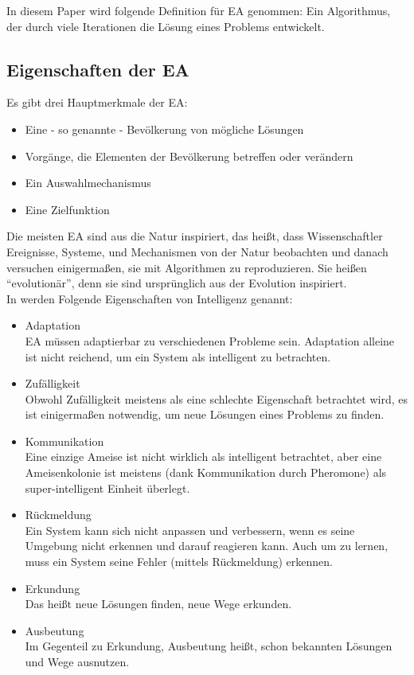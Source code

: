 \documentclass[twoside,twocolumn]{article}
\begin{document}
In diesem Paper wird folgende Definition für EA genommen: Ein Algorithmus, der durch viele Iterationen die Lösung eines Problems entwickelt.

\subsection{Eigenschaften der EA}
Es gibt drei Hauptmerkmale der EA:

\begin{itemize}
\item Eine - so genannte - Bevölkerung von mögliche Lösungen
\item Vorgänge, die Elementen der Bevölkerung betreffen oder verändern
\item Ein Auswahlmechanismus
\item Eine Zielfunktion
\end{itemize}

Die meisten EA sind aus die Natur inspiriert, das heißt, dass Wissenschaftler Ereignisse, Systeme, und Mechanismen von der Natur beobachten und danach versuchen einigermaßen, sie mit Algorithmen zu reproduzieren. Sie heißen ``evolutionär'', denn sie sind ursprünglich aus der Evolution inspiriert. \cite{holland_ga}\\

In \cite{wiley_evolutionary} werden Folgende Eigenschaften von Intelligenz genannt:

\begin{itemize}
\item Adaptation\\
EA müssen adaptierbar zu verschiedenen Probleme sein. Adaptation alleine ist nicht reichend, um ein System als intelligent zu betrachten.\\
\item Zufälligkeit\\
Obwohl Zufälligkeit meistens als eine schlechte Eigenschaft betrachtet wird, es ist einigermaßen notwendig, um neue Lösungen eines Problems zu finden.\\
\item Kommunikation\\
Eine einzige Ameise ist nicht wirklich als intelligent betrachtet, aber eine Ameisenkolonie ist meistens (dank Kommunikation durch Pheromone) als super-intelligent Einheit überlegt.\\
\item Rückmeldung\\
Ein System kann sich nicht anpassen und verbessern, wenn es seine Umgebung nicht erkennen und darauf reagieren kann. Auch um zu lernen, muss ein System seine Fehler (mittels Rückmeldung) erkennen.\\
\item Erkundung\\
Das heißt neue Lösungen finden, neue Wege erkunden.\\
\item Ausbeutung\\
Im Gegenteil zu Erkundung, Ausbeutung heißt, schon bekannten Lösungen und Wege ausnutzen.\\
\end{itemize}
\end{document}
